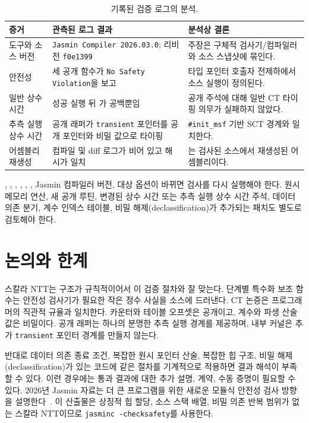 \documentclass[10pt,twocolumn]{article}
\newcommand{\jasmin}{Jasmin}
\newcommand{\ct}{상수 시간}
\newcommand{\sct}{추측 실행 상수 시간}
\begin{document}
\begin{table}[t]
\centering
\scriptsize
\setlength{\tabcolsep}{3pt}
\begin{tabular}{P{0.25\columnwidth}P{0.30\columnwidth}P{0.35\columnwidth}}
\toprule
증거 & 관측된 로그 결과 & 분석상 결론 \tabularnewline
\midrule
도구와 소스 버전 & \texttt{Jasmin Compiler 2026.03.0}; 리비전
\texttt{f0e1399} & 주장은 구체적 검사기/컴파일러와 소스 스냅샷에 묶인다.
\tabularnewline
안전성 & 세 공개 함수가 \texttt{No Safety Violation}을 보고 & 타입 포인터
호출자 전제하에서 소스 실행이 정의된다. \tabularnewline
일반 \ct{} & 성공 실행 뒤 가 공백뿐임 & 공개 주석에
대해 일반 CT 타이핑 의무가 실패하지 않았다. \tabularnewline
\sct{} & 공개 래퍼가 \texttt{transient} 포인터를 공개 포인터와 비밀 값으로
타이핑 & \texttt{\#init\_msf} 기반 SCT 경계와 일치한다. \tabularnewline
어셈블리 재생성 & 컴파일 및 diff 로그가 비어 있고 해시가 일치 &
는 검사된 소스에서 재생성된 어셈블리이다. \tabularnewline
\bottomrule
\end{tabular}
\caption{기록된 검증 로그의 분석.}
\label{tab:ko-results}
\end{table}

, , , ,
, , \jasmin{} 컴파일러 버전, 대상 옵션이
바뀌면 검사를 다시 실행해야 한다. 원시 메모리 연산, 새 공개 루틴, 변경된
\ct{} 또는 \sct{} 주석, 데이터 의존 분기, 계수 인덱스 테이블,
비밀 해제(declassification)가 추가되는 패치도 별도로 검토해야 한다.

\section{논의와 한계}

스칼라 NTT는 구조가 규칙적이어서 이 검증 절차와 잘 맞는다. 단계별
특수화 보조 함수는 안전성 검사기가 필요한 작은 정수 사실을 소스에
드러낸다. CT 논증은
프로그래머의 직관적 규율과 일치한다. 카운터와 테이블 오프셋은 공개이고,
계수와 파생 산술 값은 비밀이다. 공개 래퍼는 하나의 분명한 추측 실행
경계를 제공하며, 내부 커널은 추가 \texttt{transient} 포인터 경계를 만들지 않는다.

반대로 데이터 의존 종료 조건, 복잡한 원시 포인터 산술, 복잡한 힙 구조,
비밀 해제(declassification)가 있는 코드에 같은 절차를 기계적으로 적용하면
결과 해석이 부족할 수 있다. 이런 경우에는 통과 결과에 대한 추가 설명, 계약, 수동
증명이 필요할 수 있다. 2026년 \jasmin{} 자료는 더 큰 프로그램을 위한
새로운 모듈식 안전성 검사 방향을 설명한다~\cite{JasminFramework2026}.
이 산출물은 상징적 힙 할당, 소스 스택 배열, 비밀 의존 반복 범위가
없는 스칼라 NTT이므로 \texttt{jasminc -checksafety}를 사용한다.
\end{document}
